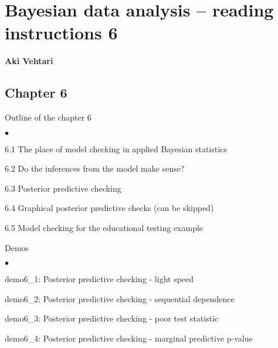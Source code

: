 \documentclass[a4paper,11pt,english]{article}
\begin{document}
\thispagestyle{empty}

\section*{Bayesian data analysis -- reading instructions 6} 
\smallskip
{\bf Aki Vehtari}
\smallskip

\subsection*{Chapter 6}

Outline of the chapter 6
\begin{list}{$\bullet$}{\parsep=0pt\itemsep=2pt}
\item 6.1 The place of model checking in applied Bayesian statistics
\item 6.2 Do the inferences from the model make sense?
\item 6.3 Posterior predictive checking
\item 6.4 Graphical posterior predictive checks (can be skipped)
\item 6.5 Model checking for the educational testing example
\end{list}

Demos
\begin{list}{$\bullet$}{\parsep=0pt\itemsep=2pt}
\item demo6\_1: Posterior predictive checking - light speed
\item demo6\_2: Posterior predictive checking - sequential dependence
\item demo6\_3: Posterior predictive checking - poor test statistic
\item demo6\_4: Posterior predictive checking - marginal predictive p-value
\end{list}
\end{document}
